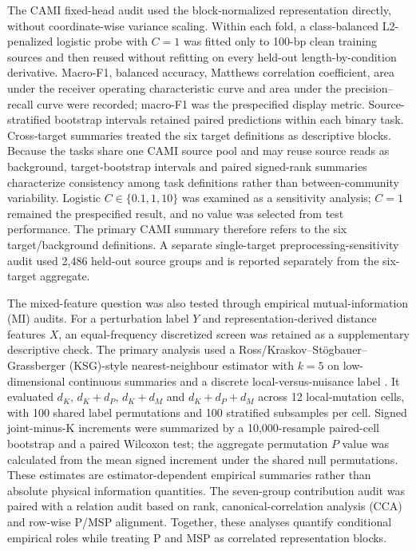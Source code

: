 The CAMI fixed-head audit used the block-normalized representation directly, without coordinate-wise variance scaling. Within each fold, a class-balanced L2-penalized logistic probe with $C=1$ was fitted only to 100-bp clean training sources and then reused without refitting on every held-out length-by-condition derivative. Macro-F1, balanced accuracy, Matthews correlation coefficient, area under the receiver operating characteristic curve and area under the precision--recall curve were recorded; macro-F1 was the prespecified display metric. Source-stratified bootstrap intervals retained paired predictions within each binary task. Cross-target summaries treated the six target definitions as descriptive blocks. Because the tasks share one CAMI source pool and may reuse source reads as background, target-bootstrap intervals and paired signed-rank summaries characterize consistency among task definitions rather than between-community variability. Logistic $C\in\{0.1,1,10\}$ was examined as a sensitivity analysis; $C=1$ remained the prespecified result, and no value was selected from test performance.
The primary CAMI summary therefore refers to the six target/background definitions. A separate single-target preprocessing-sensitivity audit used 2,486 held-out source groups and is reported separately from the six-target aggregate.

The mixed-feature question was also tested through empirical mutual-information (MI) audits. For a perturbation label $Y$ and representation-derived distance features $X$, an equal-frequency discretized screen was retained as a supplementary descriptive check. The primary analysis used a Ross/Kraskov--St\"ogbauer--Grassberger (KSG)-style nearest-neighbour estimator with $k=5$ on low-dimensional continuous summaries and a discrete local-versus-nuisance label \citep{Kraskov2004,Ross2014}. It evaluated $d_K$, $d_K+d_P$, $d_K+d_M$ and $d_K+d_P+d_M$ across 12 local-mutation cells, with 100 shared label permutations and 100 stratified subsamples per cell. Signed joint-minus-K increments were summarized by a 10,000-resample paired-cell bootstrap and a paired Wilcoxon test; the aggregate permutation $P$ value was calculated from the mean signed increment under the shared null permutations. These estimates are estimator-dependent empirical summaries rather than absolute physical information quantities. The seven-group contribution audit was paired with a relation audit based on rank, canonical-correlation analysis (CCA) and row-wise P/MSP alignment. Together, these analyses quantify conditional empirical roles while treating P and MSP as correlated representation blocks.

